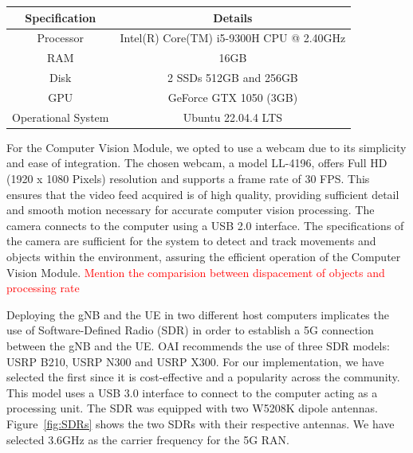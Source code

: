 \begin{table}[H]
    \begin{tabular}{|c|c|}
        \hline
        \textbf{Specification} & \textbf{Details} \\ \hline
        Processor                      &           Intel(R) Core(TM) i5-9300H CPU @ 2.40GHz   \\ \hline
        RAM                      &          16GB        \\ \hline
        Disk                      &   2 SSDs  512GB and 256GB         \\ \hline
        GPU                     &   GeForce GTX 1050 (3GB)      \\ \hline
        Operational System & Ubuntu 22.04.4 LTS                  \\ \hline
    \end{tabular}\label{tab:specs_pc}
\end{table}

For the Computer Vision Module, we opted to use a webcam due to its simplicity and ease of integration.
The chosen webcam, a model LL-4196, offers Full HD (1920 x 1080 Pixels) resolution and supports a frame rate of 30 FPS\@.
This ensures that the video feed acquired is of high quality, providing sufficient detail and smooth motion necessary for accurate computer vision processing.
The camera connects to the computer using a USB 2.0 interface.
The specifications of the camera are sufficient for the system to detect and track movements and objects within the environment, assuring the efficient operation of the Computer Vision Module.
\textcolor{red}{Mention the comparision between dispacement of objects and processing rate}

Deploying the gNB and the UE in two different host computers implicates the use of Software-Defined Radio (SDR) in order to establish a 5G connection between the gNB and the UE.
OAI recommends the use of three SDR models: USRP B210, USRP N300 and USRP X300\@ \cite{}. %
For our implementation, we have selected the first since it is cost-effective and a popularity across the community.
This model uses a USB 3.0 interface to connect to the computer acting as a processing unit.
The SDR was equipped with two W5208K dipole antennas.
Figure~\ref{fig:SDRs} shows the two SDRs with their respective antennas.
We have selected 3.6GHz as the carrier frequency for the 5G RAN\@.

